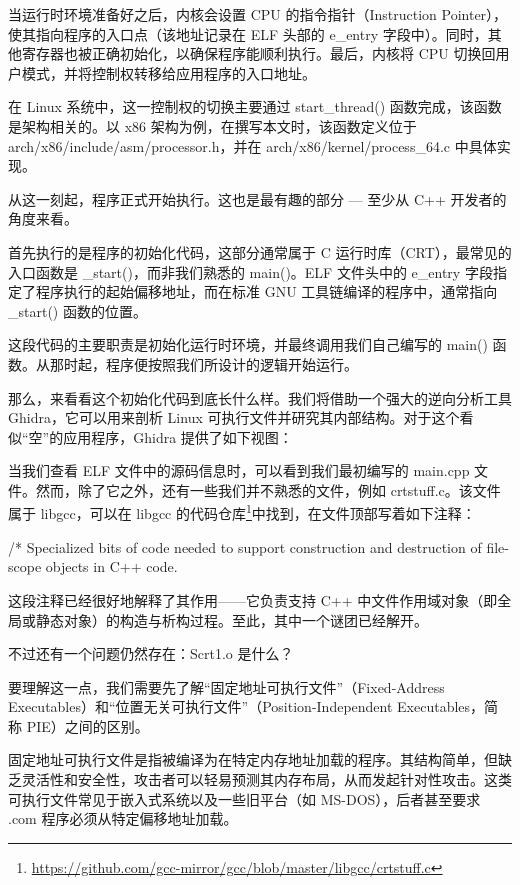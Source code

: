 当运行时环境准备好之后，内核会设置 CPU 的指令指针（Instruction Pointer），使其指向程序的入口点（该地址记录在 ELF 头部的 e\_entry 字段中）。同时，其他寄存器也被正确初始化，以确保程序能顺利执行。最后，内核将 CPU 切换回用户模式，并将控制权转移给应用程序的入口地址。

在 Linux 系统中，这一控制权的切换主要通过 start\_thread() 函数完成，该函数是架构相关的。以 x86 架构为例，在撰写本文时，该函数定义位于 arch/x86/include/asm/processor.h，并在 arch/x86/kernel/process\_64.c 中具体实现。

从这一刻起，程序正式开始执行。这也是最有趣的部分 --- 至少从 C++ 开发者的角度来看。

首先执行的是程序的初始化代码，这部分通常属于 C 运行时库（CRT），最常见的入口函数是 \_start()，而非我们熟悉的 main()。ELF 文件头中的 e\_entry 字段指定了程序执行的起始偏移地址，而在标准 GNU 工具链编译的程序中，通常指向 \_start() 函数的位置。

这段代码的主要职责是初始化运行时环境，并最终调用我们自己编写的 main() 函数。从那时起，程序便按照我们所设计的逻辑开始运行。

那么，来看看这个初始化代码到底长什么样。我们将借助一个强大的逆向分析工具 Ghidra，它可以用来剖析 Linux 可执行文件并研究其内部结构。对于这个看似“空”的应用程序，Ghidra 提供了如下视图：


当我们查看 ELF 文件中的源码信息时，可以看到我们最初编写的 main.cpp 文件。然而，除了它之外，还有一些我们并不熟悉的文件，例如 crtstuff.c。该文件属于 libgcc，可以在 libgcc 的代码仓库\footnote{\url{https://github.com/gcc-mirror/gcc/blob/master/libgcc/crtstuff.c}}中找到，在文件顶部写着如下注释：

\begin{cpp}
/* Specialized bits of code needed to support construction and destruction of file-scope objects in C++ code.
\end{cpp}

这段注释已经很好地解释了其作用——它负责支持 C++ 中文件作用域对象（即全局或静态对象）的构造与析构过程。至此，其中一个谜团已经解开。

不过还有一个问题仍然存在：Scrt1.o 是什么？

要理解这一点，我们需要先了解“固定地址可执行文件”（Fixed-Address Executables）和“位置无关可执行文件”（Position-Independent Executables，简称 PIE）之间的区别。

固定地址可执行文件是指被编译为在特定内存地址加载的程序。其结构简单，但缺乏灵活性和安全性，攻击者可以轻易预测其内存布局，从而发起针对性攻击。这类可执行文件常见于嵌入式系统以及一些旧平台（如 MS-DOS），后者甚至要求 .com 程序必须从特定偏移地址加载。

